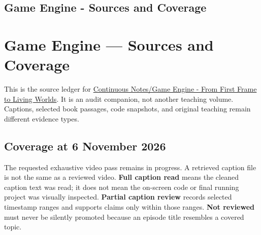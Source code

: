 \hypertarget{appendix-877738f6f4d2}{}
\section*{Game Engine - Sources and Coverage}
\chapter{Game Engine --- Sources and Coverage}\label{appendix-877738f6f4d2-game-engine-sources-and-coverage}

This is the source ledger for \href{Continuous\%20Notes/Game\%20Engine\%20-\%20From\%20First\%20Frame\%20to\%20Living\%20Worlds}{Continuous Notes/Game Engine - From First Frame to Living Worlds}. It is an audit companion, not another teaching volume. Captions, selected book passages, code snapshots, and original teaching remain different evidence types.

\section{Coverage at 6 November 2026}\label{appendix-877738f6f4d2-coverage-at-6-november-2026}

The requested exhaustive video pass remains in progress. A retrieved caption file is not the same as a reviewed video. \textbf{Full caption read} means the cleaned caption text was read; it does not mean the on-screen code or final running project was visually inspected. \textbf{Partial caption review} records selected timestamp ranges and supports claims only within those ranges. \textbf{Not reviewed} must never be silently promoted because an episode title resembles a covered topic.

